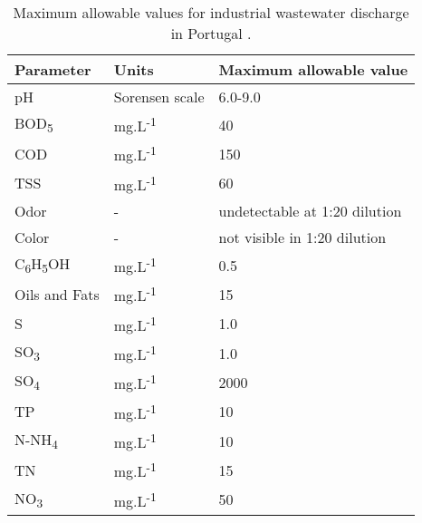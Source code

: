 \begin{table}[]
\centering
\caption{Maximum allowable values for industrial wastewater discharge in Portugal \cite{MinistryofEnvironment1998}. }
\label{table1}
\begin{tabular}{lll}
\hline
\textbf{Parameter}   & \textbf{Units}                                                  & \textbf{Maximum allowable value} \\ \hline
pH                   & Sorensen scale                                                  & 6.0-9.0                          \\
BOD\textsubscript{5} & mg.L\textsuperscript{-1}                     & 40                               \\
COD                  & mg.L\textsuperscript{-1}                     & 150                              \\
TSS                  & mg.L\textsuperscript{-1}                                        & 60                               \\
Odor                 & -                                                               & undetectable at 1:20 dilution    \\
Color                & -                                                               & not visible in 1:20 dilution     \\
C\textsubscript{6}H\textsubscript{5}OH              & mg.L\textsuperscript{-1}          & 0.5                             \\
Oils and Fats        & mg.L\textsuperscript{-1}                                        & 15                               \\
S                    & mg.L\textsuperscript{-1}                                      & 1.0                               \\
SO\textsubscript{3}  & mg.L\textsuperscript{-1}                    & 1.0                                                 \\
SO\textsubscript{4}  & mg.L\textsuperscript{-1}                    & 2000                                                \\
TP                   & mg.L\textsuperscript{-1}                                      & 10                                \\
N-NH\textsubscript{4}     & mg.L\textsuperscript{-1}                  & 10                                               \\
TN                   & mg.L\textsuperscript{-1}                                      & 15                                \\
NO\textsubscript{3}  & mg.L\textsuperscript{-1}                  & 50                              
\end{tabular}
\end{table}